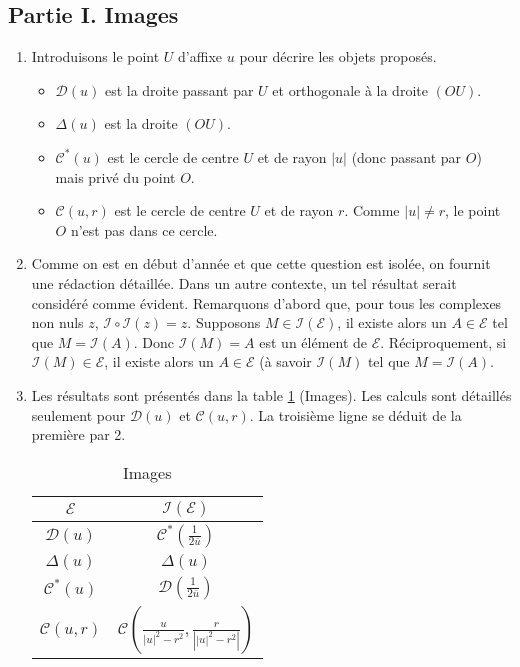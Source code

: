 \subsection*{Partie I. Images}
\begin{enumerate}
 \item Introduisons le point $U$ d'affixe $u$ pour décrire les objets proposés.
\begin{itemize}
 \item $\mathcal D(u)$ est la droite passant par $U$ et orthogonale à la droite $(OU)$.
\item $\Delta (u)$ est la droite $(OU)$.
\item $\mathcal C^*(u)$  est le cercle de centre $U$ et de rayon $|u|$ (donc passant par $O$) mais privé du point $O$.
\item $\mathcal C(u,r)$ est le cercle de centre $U$ et de rayon $r$. Comme $|u|\neq r$, le point $O$ n'est pas dans ce cercle.
\end{itemize}

\item Comme on est en début d'année et que cette question est isolée, on fournit une rédaction détaillée. Dans un autre contexte, un tel résultat serait considéré comme évident.\newline
Remarquons d'abord que, pour tous les complexes non nuls $z$, $\mathcal I \circ \mathcal I (z)=z$.\newline 
Supposons $M\in \mathcal I (\mathcal E)$, il existe alors un $A\in \mathcal E$ tel que $M=\mathcal I (A)$. Donc $\mathcal I(M)=A$ est un élément de $\mathcal E$.\newline
Réciproquement, si $\mathcal I(M)\in \mathcal E$, il existe alors un $A\in \mathcal E$ (à savoir $\mathcal I (M)$ tel que $M=\mathcal I (A)$.

\item Les résultats sont présentés dans la table \ref{tab:images} (Images). Les calculs sont détaillés seulement pour $\mathcal D(u)$ et $\mathcal C(u,r)$. La troisième ligne se déduit de la première par 2.
\begin{table}[h]
 \centering
 \renewcommand{\arraystretch}{2.5}
 \begin{tabular}{|c|c|}
\hline
 $\mathcal E$ & $\mathcal I(\mathcal E)$ \\
\hline
 $\mathcal D(u)$ & $\mathcal C^*(\frac{1}{2\overline{u}})$\\
\hline  $\Delta(u)$ & $\Delta(u)$\\
\hline $\mathcal C^*(u)$ & $\mathcal D(\frac{1}{2\overline{u}})$\\
\hline $\mathcal C(u,r)$ & $\mathcal C \left(\frac{u}{|u|^2-r^2},\frac{r}{\left\vert |u|^2-r^2\right\vert } \right) $\\
\hline
\end{tabular}
 \caption{Images}
 \label{tab:images}
\end{table}


\end{enumerate}

